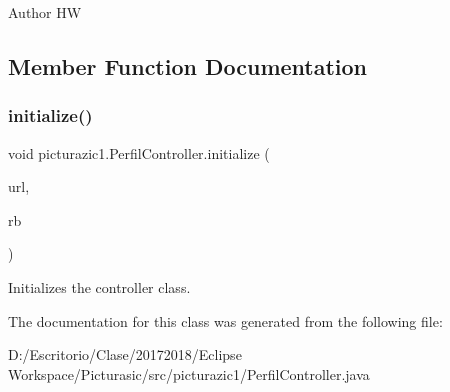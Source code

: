 \begin{DoxyAuthor}{Author}
HW 
\end{DoxyAuthor}


\subsection{Member Function Documentation}
\mbox{\label{classpicturazic1_1_1_perfil_controller_afd50104608ebc66473ab172ccad35a3f}} 
\subsubsection{\texorpdfstring{initialize()}{initialize()}}
{\footnotesize\ttfamily void picturazic1.\+Perfil\+Controller.\+initialize (\begin{DoxyParamCaption}\item[{U\+RL}]{url,  }\item[{Resource\+Bundle}]{rb }\end{DoxyParamCaption})}

Initializes the controller class. 

The documentation for this class was generated from the following file\+:\begin{DoxyCompactItemize}
\item 
D\+:/\+Escritorio/\+Clase/20172018/\+Eclipse Workspace/\+Picturasic/src/picturazic1/Perfil\+Controller.\+java\end{DoxyCompactItemize}
